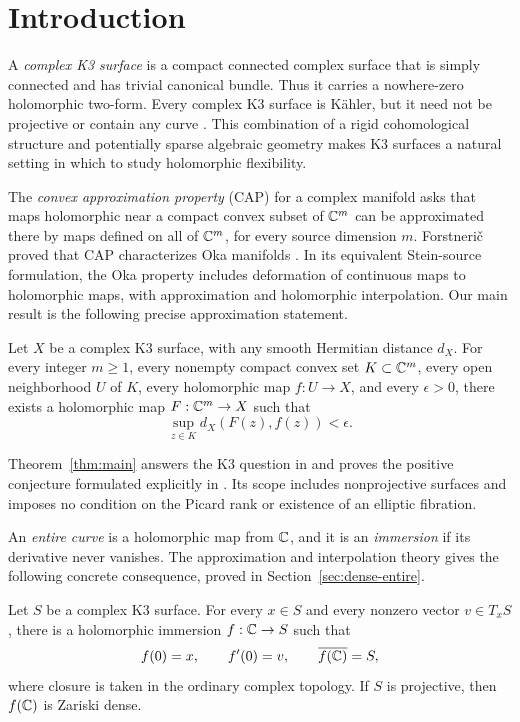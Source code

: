\section{Introduction}\label{sec:introduction}

A \emph{complex K3 surface} is a compact connected complex surface that
is simply connected and has trivial canonical bundle. Thus it carries
a nowhere-zero holomorphic two-form. Every complex K3 surface is
K\"ahler, but it need not be projective or contain any curve
\cite[Chapters~1 and~7]{Huybrechts}. This combination of a rigid
cohomological structure and potentially sparse algebraic geometry makes
K3 surfaces a natural setting in which to study holomorphic flexibility.

The \emph{convex approximation property} (CAP) for a complex manifold
asks that maps holomorphic near a compact convex subset of $\mathbb C^m$ can
be approximated there by maps defined on all of $\mathbb C^m$, for every
source dimension $m$. Forstneri\v c proved that CAP characterizes Oka
manifolds \cite{ForstnericCAP,Forstneric}. In its equivalent Stein-source
formulation, the Oka property includes deformation of continuous maps
to holomorphic maps, with approximation and holomorphic interpolation.
Our main result is the following precise approximation statement.

\begin{theorem}\label{thm:main}
Let $X$ be a complex K3 surface, with any smooth Hermitian distance
$d_X$. For every integer $m\geq1$, every nonempty compact convex set
$K\subset\mathbb C^m$, every open neighborhood $U$ of $K$, every holomorphic
map $f:U\to X$, and every $\epsilon>0$, there exists a holomorphic map
$F:\mathbb C^m\to X$ such that
\[
                  \sup_{z\in K}d_X(F(z),f(z))<\epsilon.
\]
\end{theorem}

Theorem~\ref{thm:main} answers the K3 question in
\cite[Section~8, Problem~C]{ForstnericLarussonSurvey} and proves the
positive conjecture formulated explicitly in
\cite[Introduction]{XieZhao}. Its scope includes nonprojective
surfaces and imposes no condition on the Picard rank or existence of
an elliptic fibration.

An \emph{entire curve} is a holomorphic map from $\mathbb C$, and it is an
\emph{immersion} if its derivative never
vanishes. The approximation and interpolation theory gives the
following concrete consequence, proved in Section~\ref{sec:dense-entire}.

\begin{corollary}\label{cor:dense}
Let $S$ be a complex K3 surface. For every $x\in S$
and every nonzero vector $v\in T_xS$, there is a holomorphic immersion
$f:\mathbb C\to S$ such that
\[
 f(0)=x,\qquad f'(0)=v,\qquad \overline{f(\mathbb C)}=S,
\]
where closure is taken in the ordinary complex topology. If $S$ is
projective, then $f(\mathbb C)$ is Zariski dense.
\end{corollary}

